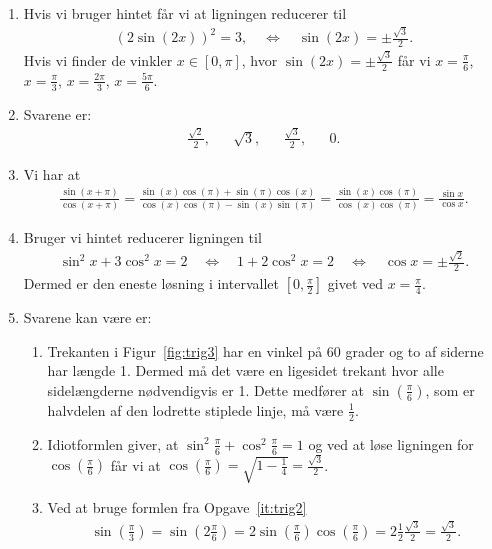 \begin{enumerate}
	\item Hvis vi bruger hintet får vi at ligningen reducerer til
	\begin{align*}
	(2\sin(2x))^2=3,\quad\Leftrightarrow\quad \sin(2x)=\pm \frac{\sqrt{3}}{2}.
	\end{align*}
	Hvis vi finder de vinkler $x\in [0,\pi]$, hvor $\sin(2x)=\pm\frac{\sqrt{3}}{2}$ får vi	$x=\frac{\pi}{6}$, $x=\frac{\pi}{3}$, $x=\frac{2\pi}{3}$, $x=\frac{5\pi}{6}$.
	
	
	\item Svarene er:
	\begin{align*}
	\frac{\sqrt{2}}{2},&& \sqrt{3},&& \frac{\sqrt{3}}{2},&& 0.
	\end{align*}
	
	\item Vi har at 
	\begin{align*}
	\frac{\sin(x+\pi)}{\cos(x+\pi)}=\frac{\sin(x)\cos(\pi)+\sin(\pi)\cos(x)}{\cos(x)\cos(\pi)-\sin(x)\sin(\pi)}=\frac{\sin(x)\cos(\pi)}{\cos(x)\cos(\pi)}=\frac{\sin x}{\cos x}.
	\end{align*}
	
	\item Bruger vi hintet reducerer ligningen til
	\begin{align*}
	\sin^2 x+ 3\cos^2 x=2\quad \Leftrightarrow\quad 1+2\cos^2 x=2\quad \Leftrightarrow\quad \cos x =\pm \frac{\sqrt{2}}{2}.
	\end{align*}
	Dermed er den eneste løsning i intervallet $[0,\frac{\pi}{2}]$ givet ved $x=\frac{\pi}{4}$.
	
	\item \label{it:trig3} Svarene kan være er:
	
	\begin{enumerate}
		\item Trekanten i Figur~\ref{fig:trig3} har en vinkel på $60$ grader og to af siderne har længde 1. Dermed må det være en ligesidet trekant hvor alle sidelængderne nødvendigvis er 1. Dette medfører at $\sin(\frac{\pi}{6})$, som er halvdelen af den lodrette stiplede linje, må være $\frac{1}{2}$.
		
		\item Idiotformlen giver, at $\sin^2 \frac{\pi}{6}+\cos^2\frac{\pi}{6}=1$ og ved at løse ligningen for $\cos(\frac{\pi}{6})$ får vi at $ \cos(\frac{\pi}{6})=\sqrt{1-\frac{1}{4}}=\frac{\sqrt{3}}{2} $.
		
		\item Ved at bruge formlen fra Opgave~\ref{it:trig2}
		\begin{align*}
		 \sin(\frac{\pi}{3})=\sin(2\frac{\pi}{6}) =2\sin(\frac{\pi}{6})\cos(\frac{\pi}{6})=2\frac{1}{2}\frac{\sqrt{3}}{2}=\frac{\sqrt{3}}{2}.
		\end{align*}
		

\end{enumerate}
\end{enumerate}
